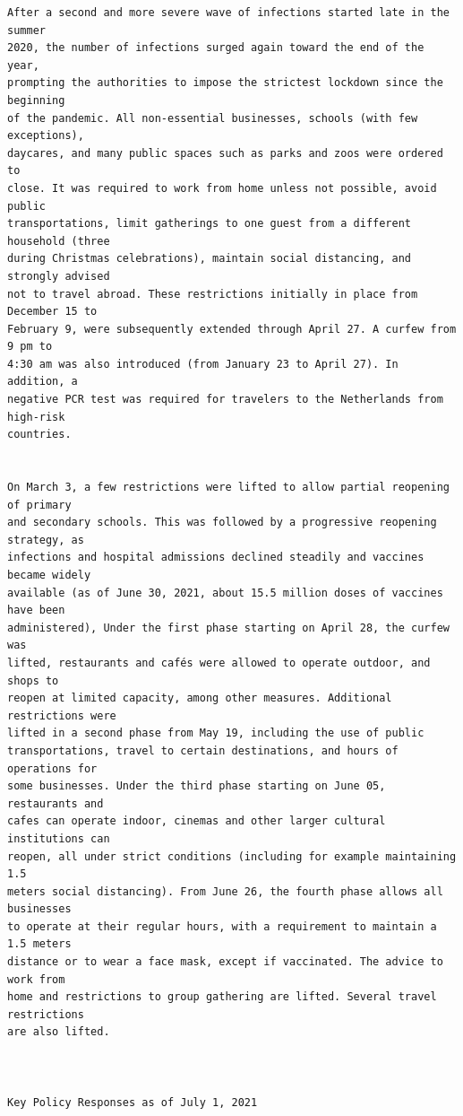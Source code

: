 \documentclass[10pt, letterpaper]{article}
\begin{document}
\begin{spacing}{1.4}
\begin{scriptsize}
\begin{spacing}{.85}
\begin{verbatim}
After a second and more severe wave of infections started late in the summer
2020, the number of infections surged again toward the end of the year,
prompting the authorities to impose the strictest lockdown since the beginning
of the pandemic. All non-essential businesses, schools (with few exceptions),
daycares, and many public spaces such as parks and zoos were ordered to
close. It was required to work from home unless not possible, avoid public
transportations, limit gatherings to one guest from a different household (three
during Christmas celebrations), maintain social distancing, and strongly advised
not to travel abroad. These restrictions initially in place from December 15 to
February 9, were subsequently extended through April 27. A curfew from 9 pm to
4:30 am was also introduced (from January 23 to April 27). In addition, a
negative PCR test was required for travelers to the Netherlands from high-risk
countries.


On March 3, a few restrictions were lifted to allow partial reopening of primary
and secondary schools. This was followed by a progressive reopening strategy, as
infections and hospital admissions declined steadily and vaccines became widely
available (as of June 30, 2021, about 15.5 million doses of vaccines have been
administered), Under the first phase starting on April 28, the curfew was
lifted, restaurants and cafés were allowed to operate outdoor, and shops to
reopen at limited capacity, among other measures. Additional restrictions were
lifted in a second phase from May 19, including the use of public
transportations, travel to certain destinations, and hours of operations for
some businesses. Under the third phase starting on June 05, restaurants and
cafes can operate indoor, cinemas and other larger cultural institutions can
reopen, all under strict conditions (including for example maintaining 1.5
meters social distancing). From June 26, the fourth phase allows all businesses
to operate at their regular hours, with a requirement to maintain a 1.5 meters
distance or to wear a face mask, except if vaccinated. The advice to work from
home and restrictions to group gathering are lifted. Several travel restrictions
are also lifted.



Key Policy Responses as of July 1, 2021


\end{verbatim}
\end{spacing}
\end{scriptsize}
\end{spacing}
\end{document}
